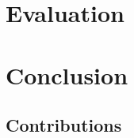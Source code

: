 \documentclass{l3proj}
\begin{document}
\chapter{Evaluation}

\chapter{Conclusion}

\section{Contributions}



\end{document}
